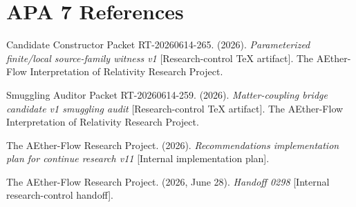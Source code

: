 \documentclass[11pt]{article}
\begin{document}
\section{APA 7 References}

Candidate Constructor Packet RT-20260614-265. (2026). \emph{Parameterized
finite/local source-family witness v1} [Research-control TeX artifact]. The
AEther-Flow Interpretation of Relativity Research Project.

Smuggling Auditor Packet RT-20260614-259. (2026). \emph{Matter-coupling
bridge candidate v1 smuggling audit} [Research-control TeX artifact]. The
AEther-Flow Interpretation of Relativity Research Project.

The AEther-Flow Research Project. (2026). \emph{Recommendations implementation
plan for continue research v11} [Internal implementation plan].

The AEther-Flow Research Project. (2026, June 28). \emph{Handoff 0298}
[Internal research-control handoff].
\end{document}
